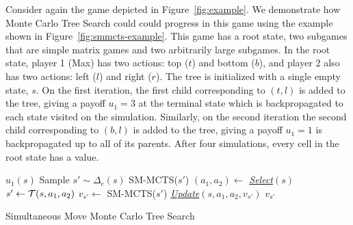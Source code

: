 Consider again the game depicted in Figure~\ref{fig:example}. We demonstrate how Monte Carlo Tree Search 
could could progress in this game using the example shown in Figure~\ref{fig:smmcts-example}. This game has a root state, 
two subgames that are simple matrix games and two arbitrarily large subgames. In the root state, player 1 (Max) has two 
actions: top ($t$) and bottom ($b$), and player 2 also has two actions: left ($l$) and right ($r$). The tree is initialized 
with a single empty state, $s$. On the first iteration, the first child corresponding to $(t,l)$ is added to the tree, 
giving a payoff $u_1 = 3$ at the terminal state which is backpropagated to each state visited on the simulation. 
Similarly, on the second iteration the second child corresponding to $(b,l)$ is added to the tree, giving a payoff $u_1 = 1$ is 
backpropagated up to all of its parents. 
After four simulations, every cell in the root state has a value. 

\begin{algorithm2e}[t]
\small
{}
 {
	\Return $u_1(s)$\;
}
 {
        Sample $s' \sim \Delta_c(s)$\;
	\Return SM-MCTS($s'$)\;
}
 {
	$(a_1, a_2) \leftarrow$ \emph{\underline{Select}}$(s)$\;\label{alg:smmcts:select}
	$s' \leftarrow \mathcal{T}(s,a_1,a_2)$\;
	$v_{s'} \leftarrow $ SM-MCTS($s'$)\;\label{alg:smmcts:reccall}
	\emph{\underline{Update}}$(s,a_1,a_2,v_{s'})$\;\label{alg:smmcts:up}
	\Return $v_{s'}$\;
}
\caption{Simultaneous Move Monte Carlo Tree Search}\label{alg:smmcts}
\end{algorithm2e}

